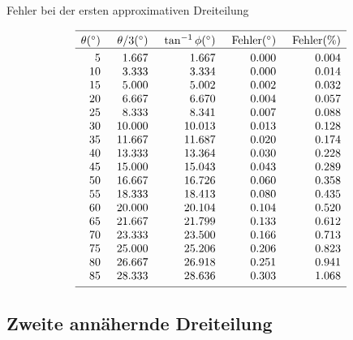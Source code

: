 \begin{table}[t]
\caption{Fehler bei der ersten approximativen Dreiteilung}\label{t.trisect-first}
\[
%
\begin{array}{r@{\hspace{5mm}}r@{\hspace{5mm}}r@{\hspace{5mm}}r@{\hspace{5mm}}r}
\hline
\noalign{\smallskip}
\theta ({}^\circ) & \theta/3 ({}^\circ)& \tan^{-1} \phi ({}^\circ) & \mathrm{Fehler} ({}^\circ) & \mathrm{Fehler (\%)}\\\hline
\noalign{\smallskip}
  5 &    1.667 &    1.667  &     0.000 &    0.004 \\
 10 &    3.333 &    3.334  &     0.000 &    0.014 \\
 15 &    5.000 &    5.002  &     0.002 &    0.032 \\
 20 &    6.667 &    6.670  &     0.004 &    0.057 \\
 25 &    8.333 &    8.341  &     0.007 &    0.088 \\
 30 &   10.000 &   10.013  &     0.013 &    0.128 \\
 35 &   11.667 &   11.687  &     0.020 &    0.174 \\
 40 &   13.333 &   13.364  &     0.030 &    0.228 \\
 45 &   15.000 &   15.043  &     0.043 &    0.289 \\
 50 &   16.667 &   16.726  &     0.060 &    0.358 \\
 55 &   18.333 &   18.413  &     0.080 &    0.435 \\
 60 &   20.000 &   20.104  &     0.104 &    0.520 \\
 65 &   21.667 &   21.799  &     0.133 &    0.612 \\
 70 &   23.333 &   23.500  &     0.166 &    0.713 \\
 75 &   25.000 &   25.206  &     0.206 &    0.823 \\
 80 &   26.667 &   26.918  &     0.251 &    0.941 \\
 85 &   28.333 &   28.636  &     0.303 &    1.068 \\
 \noalign{\smallskip}
 \hline
 \end{array}
\]
\end{table}

\subsection{Zweite annähernde Dreiteilung}

